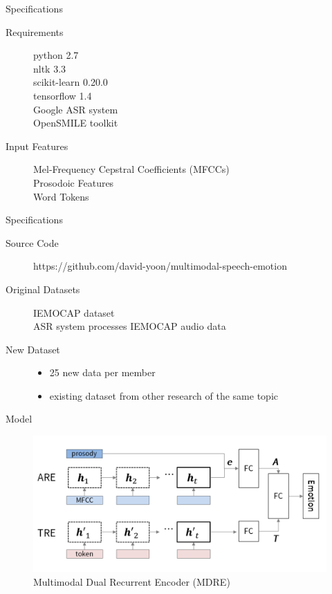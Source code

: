 \documentclass{beamer}
\begin{document}
    \begin{frame}{Specifications}
        \begin{description}
            \item[Requirements]
                python 2.7 \\
                nltk 3.3 \\
                scikit-learn 0.20.0 \\
                tensorflow 1.4 \\
                Google ASR system \\
                OpenSMILE toolkit
            \item[Input Features]
                Mel-Frequency Cepstral Coefficients (MFCCs) \\
                Prosodoic Features \\
                Word Tokens \\
        \end{description}
    \end{frame}
    
    \begin{frame}{Specifications}
        \begin{description}
        \item[Source Code]
            https://github.com/david-yoon/multimodal-speech-emotion
        \item[Original Datasets]
                IEMOCAP dataset \\
                ASR system processes IEMOCAP audio data
        \item[New Dataset]
            \begin{itemize}
                \item 25 new data per member
                \item existing dataset from other research of the same topic
            \end{itemize}
        \end{description}
    \end{frame}
    
    \begin{frame}{Model}
        \begin{figure}
            \includegraphics[width = 1\linewidth]{Images/model.PNG}
            \caption{Multimodal Dual Recurrent Encoder (MDRE)}
            \label{fig:MDRE}
        \end{figure}
    \end{frame}
        
\end{document}

